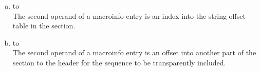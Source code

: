 \begin{enumerate}[(a)]
\item \dotdebugmacro{} to \dotdebugstroffsets \\
The second operand of a 
\DWMACROdefineindirectx{} macroinfo entry is an index
into the string offset table in the 
\dotdebugstroffsets{} section.

\item \dotdebugmacro{} to \dotdebugmacro \\
The second operand of a 
\DWMACROtransparentinclude{} macroinfo
entry is an offset into another part of the 
\dotdebugmacro{} section to the header for the 
sequence to be transparently included.


\end{enumerate}
